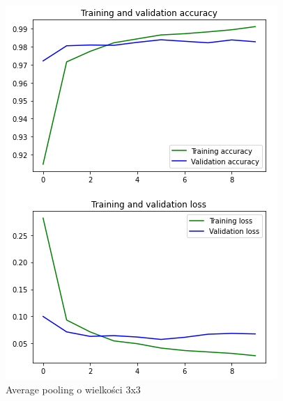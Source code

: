 \documentclass{article}
\begin{document}
\begin{figure}[h]
  \centering
  \includegraphics[width=\linewidth]{pooling_3_3.png}
  \caption{Average pooling o wielkości 3x3}
\end{figure}
\end{document}
